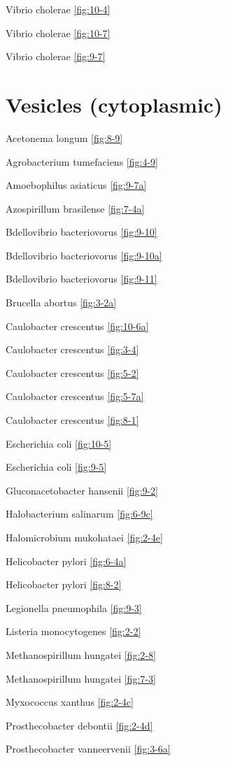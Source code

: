 \documentclass[]{tufte-book}
\begin{document}
Vibrio cholerae \ref{fig:10-4}

Vibrio cholerae \ref{fig:10-7}

Vibrio cholerae \ref{fig:9-7}

\section*{Vesicles (cytoplasmic)}\label{vesicles-cytoplasmic}

Acetonema longum \ref{fig:8-9}

Agrobacterium tumefaciens \ref{fig:4-9}

Amoebophilus asiaticus \ref{fig:9-7a}

Azospirillum brasilense \ref{fig:7-4a}

Bdellovibrio bacteriovorus \ref{fig:9-10}

Bdellovibrio bacteriovorus \ref{fig:9-10a}

Bdellovibrio bacteriovorus \ref{fig:9-11}

Brucella abortus \ref{fig:3-2a}

Caulobacter crescentus \ref{fig:10-6a}

Caulobacter crescentus \ref{fig:3-4}

Caulobacter crescentus \ref{fig:5-2}

Caulobacter crescentus \ref{fig:5-7a}

Caulobacter crescentus \ref{fig:8-1}

Escherichia coli \ref{fig:10-5}

Escherichia coli \ref{fig:9-5}

Gluconacetobacter hansenii \ref{fig:9-2}

Halobacterium salinarum \ref{fig:6-9c}

Halomicrobium mukohataei \ref{fig:2-4e}

Helicobacter pylori \ref{fig:6-4a}

Helicobacter pylori \ref{fig:8-2}

Legionella pneumophila \ref{fig:9-3}

Listeria monocytogenes \ref{fig:2-2}

Methanospirillum hungatei \ref{fig:2-8}

Methanospirillum hungatei \ref{fig:7-3}

Myxococcus xanthus \ref{fig:2-4c}

Prosthecobacter debontii \ref{fig:2-4d}

Prosthecobacter vanneervenii \ref{fig:3-6a}
\end{document}
